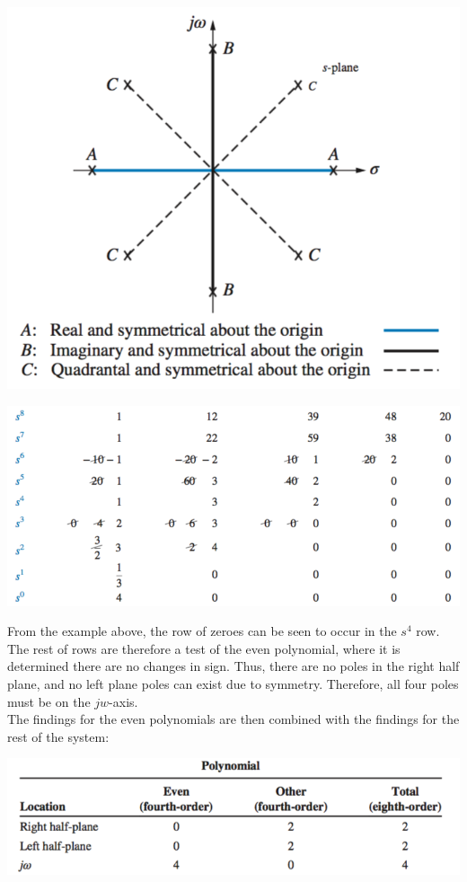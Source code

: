 \documentclass[11pt]{article}
\begin{document}
    \begin{center}
        \includegraphics[width=300 px]{img/routh-zeroes}
    \end{center}

    \begin{center}
        \includegraphics[width=300 px]{img/routh-roz-analysis}
    \end{center}

    From the example above, the row of zeroes can be seen to occur in the $s^4$ row. The rest of rows are therefore a test of the even polynomial, where it is determined there are no changes in sign. Thus, there are no poles in the right half plane, and no left plane poles can exist due to symmetry. Therefore, all four poles must be on the $jw$-axis. \\ 

    The findings for the even polynomials are then combined with the findings for the rest of the system: \\

    \begin{center}
        \includegraphics[width=300 px]{img/routh-even}
    \end{center}

    \pagebreak
    
\end{document}
